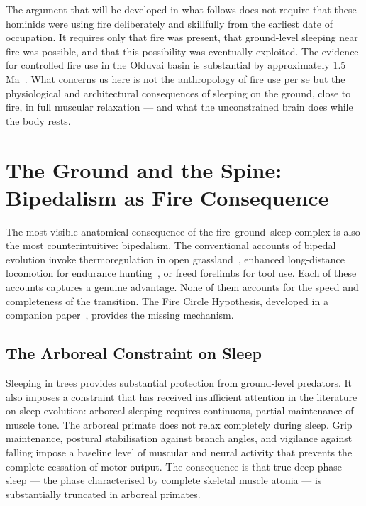 The argument that will be developed in what follows does not require that these hominids were using fire deliberately and skillfully from the earliest date of occupation. It requires only that fire was present, that ground-level sleeping near fire was possible, and that this possibility was eventually exploited. The evidence for controlled fire use in the Olduvai basin is substantial by approximately 1.5 Ma~\cite{wrangham2009}. What concerns us here is not the anthropology of fire use per se but the physiological and architectural consequences of sleeping on the ground, close to fire, in full muscular relaxation --- and what the unconstrained brain does while the body rests.

\bigskip

\section{The Ground and the Spine: Bipedalism as Fire Consequence}

The most visible anatomical consequence of the fire--ground--sleep complex is also the most counterintuitive: bipedalism. The conventional accounts of bipedal evolution invoke thermoregulation in open grassland~\cite{wheeler1984}, enhanced long-distance locomotion for endurance hunting~\cite{bramble2004}, or freed forelimbs for tool use. Each of these accounts captures a genuine advantage. None of them accounts for the speed and completeness of the transition. The Fire Circle Hypothesis, developed in a companion paper~\cite{author_bipedalism}, provides the missing mechanism.

\subsection{The Arboreal Constraint on Sleep}

Sleeping in trees provides substantial protection from ground-level predators. It also imposes a constraint that has received insufficient attention in the literature on sleep evolution: arboreal sleeping requires continuous, partial maintenance of muscle tone. The arboreal primate does not relax completely during sleep. Grip maintenance, postural stabilisation against branch angles, and vigilance against falling impose a baseline level of muscular and neural activity that prevents the complete cessation of motor output. The consequence is that true deep-phase sleep --- the phase characterised by complete skeletal muscle atonia --- is substantially truncated in arboreal primates.

